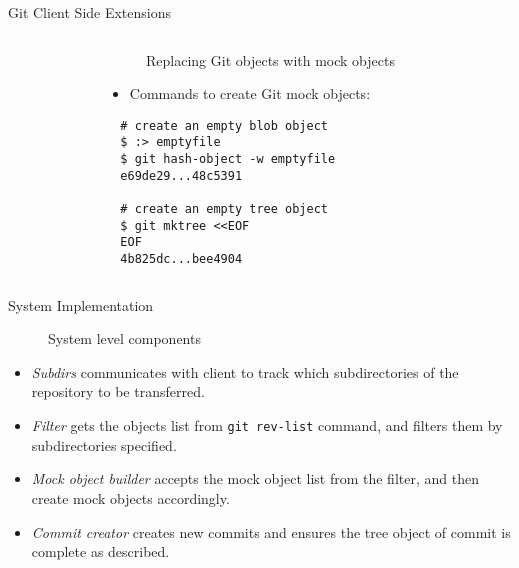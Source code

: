 \documentclass[final]{beamer}
\begin{document}
\begin{frame}[t, fragile]
\begin{columns}[t]
\begin{column}{.49\linewidth}
\begin{block}{Git Client Side Extensions}
\begin{columns}[T]
\begin{column}{.5\textwidth}
\end{column}
          \begin{column}{.5\textwidth}
              \begin{figure} \centering
                \caption{Replacing Git objects with mock objects}
              \end{figure}
              \begin{itemize}
                \item Commands to create Git mock objects:
              \end{itemize}
\begin{verbatim}
  # create an empty blob object
  $ :> emptyfile
  $ git hash-object -w emptyfile
  e69de29...48c5391

  # create an empty tree object
  $ git mktree <<EOF
  EOF
  4b825dc...bee4904
\end{verbatim}
            \end{column}
\end{columns}
      \end{block}
      \begin{block}{System Implementation}
              \begin{figure} \centering
                \caption{System level components}
              \end{figure}
\begin{itemize}
    \justifying
  \item \emph{Subdirs} communicates with client to track which subdirectories
    of the repository to be transferred.

  \item \emph{Filter} gets the objects list from
    \verb|git rev-list| command, and filters them by subdirectories specified.

  \item \emph{Mock object builder} accepts the mock object list
    from the filter, and then create mock objects accordingly.

  \item \emph{Commit creator} creates new commits and ensures
    the tree object of commit is complete as described.
\end{itemize}
      \end{block}
    \end{column}
  \end{columns}
\end{frame}
\end{document}
